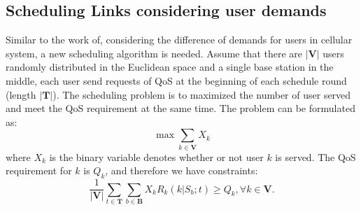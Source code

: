 \subsection{Scheduling Links considering user demands}
Similar to the work of\cite{Scheduling_Wireless_Links_with_Successive_Interference_Cancellation},
considering the difference of demands for users in cellular system,
a new scheduling algorithm is needed. Assume that there are $|\mathbf{V}|$
users randomly distributed in the Euclidean space and a single base station
in the middle, each user send requests of QoS at the beginning of each schedule
round (length $|\mathbf{T}|$). The scheduling problem is to maximized the number of user served and meet
the QoS requirement at the same time.
The problem can be formulated as:
\begin{equation}
\label{eq:single_bs_meet_qos_obj}
\max\underset{k\in \mathbf{V}}{\sum}X_k
\end{equation}
where $X_k$ is the binary variable denotes whether or not user $k$ is served.
The QoS requirement for $k$ is $Q_k$, and therefore we have constraints:
\begin{equation}
\label{single_bs_meet_qos_st}
\frac{1}{|\mathbf{V}|}\underset{t\in \mathbf{T}}{\sum}\underset{b\in \mathbf{B}}{\sum}X_k R_k(k|S_b;t)\geq Q_k, \forall k\in\mathbf{V}.
\end{equation}








